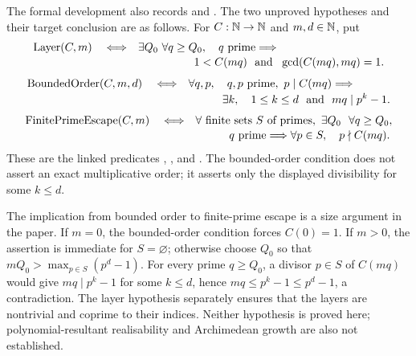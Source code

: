 \documentclass[11pt]{article}
\begin{document}
The formal development also records
and
.
The two unproved hypotheses and their target conclusion are as follows.  For
$C:\mathbb{N}\to\mathbb{N}$ and $m,d\in\mathbb{N}$, put
\[
\begin{aligned}
\operatorname{Layer}(C,m)\quad\Longleftrightarrow\quad&
\exists Q_0\ \forall q\ge Q_0,\quad q\ {\rm prime}\Longrightarrow\\[-2pt]
&\hspace{5em}1<C(mq)\ \hbox{ and }\ \gcd(C(mq),mq)=1.
\end{aligned}
\]
\[
\begin{aligned}
\operatorname{BoundedOrder}(C,m,d)\quad\Longleftrightarrow\quad&
\forall q,p,\quad q,p\ {\rm prime},\ p\mid C(mq)\Longrightarrow\\[-2pt]
&\hspace{3em}\exists k,\quad 1\le k\le d\ \hbox{ and }\ mq\mid p^k-1.
\end{aligned}
\]
\[
\begin{aligned}
\operatorname{FinitePrimeEscape}(C,m)\quad\Longleftrightarrow\quad&
\forall\text{ finite sets }S\text{ of primes},\ \exists Q_0\
\ \forall q\ge Q_0,\\[-2pt]
&\hspace{3em}q\ {\rm prime}\Longrightarrow
\forall p\in S,\quad p\nmid C(mq).
\end{aligned}
\]
These are the linked predicates
,
,
and
.
The bounded-order condition does not assert an exact multiplicative order; it
asserts only the displayed divisibility for some $k\le d$.

The implication from bounded order to finite-prime escape is a size argument
in the paper.  If $m=0$, the bounded-order condition forces $C(0)=1$.  If
$m>0$, the assertion is immediate for $S=\varnothing$; otherwise choose
$Q_0$ so that $mQ_0>\max_{p\in S}(p^d-1)$.  For every prime
$q\ge Q_0$, a divisor $p\in S$ of $C(mq)$ would give
$mq\mid p^k-1$ for some $k\le d$, hence
$mq\le p^k-1\le p^d-1$, a contradiction.  The layer hypothesis separately
ensures that the layers are nontrivial and coprime to their indices.  Neither
hypothesis is proved here; polynomial-resultant realisability and
Archimedean growth are also not established.
\end{document}
